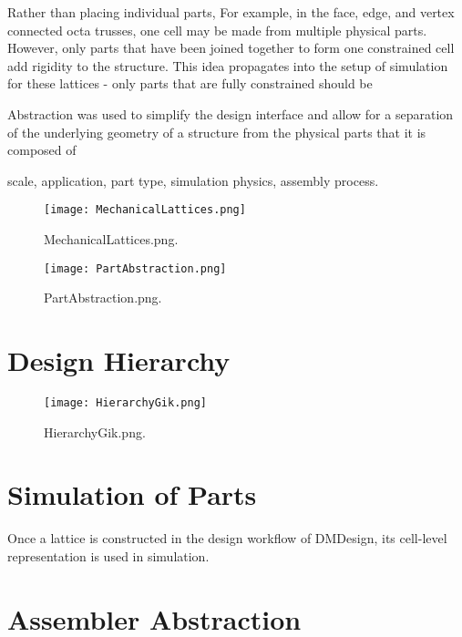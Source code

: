 {Rather than placing individual parts, 
For example, in the face, edge, and vertex connected octa trusses, one cell may be made from multiple physical parts.  However, only parts that have been joined together to form one constrained cell add rigidity to the structure.  This idea propagates into the setup of simulation for these lattices - only parts that are fully constrained should be

Abstraction was used to simplify the design interface and allow for a separation of the underlying geometry of a structure from the physical parts that it is composed of

scale, application, part type, simulation physics, assembly process.

\begin{figure}
  \texttt{[image: MechanicalLattices.png]}
  \caption{MechanicalLattices.png.}
  \label{fig:MechanicalLattices}
\end{figure}

\begin{figure}
  \texttt{[image: PartAbstraction.png]}
  \caption{PartAbstraction.png.}
  \label{fig:PartAbstraction}
\end{figure}


\section{Design Hierarchy}

\begin{figure}
  \texttt{[image: HierarchyGik.png]}
  \caption{HierarchyGik.png.}
  \label{fig:HierarchyGik}
\end{figure}

\section{Simulation of Parts}

Once a lattice is constructed in the design workflow of DMDesign, its cell-level representation is used in simulation.

\section{Assembler Abstraction}

}
